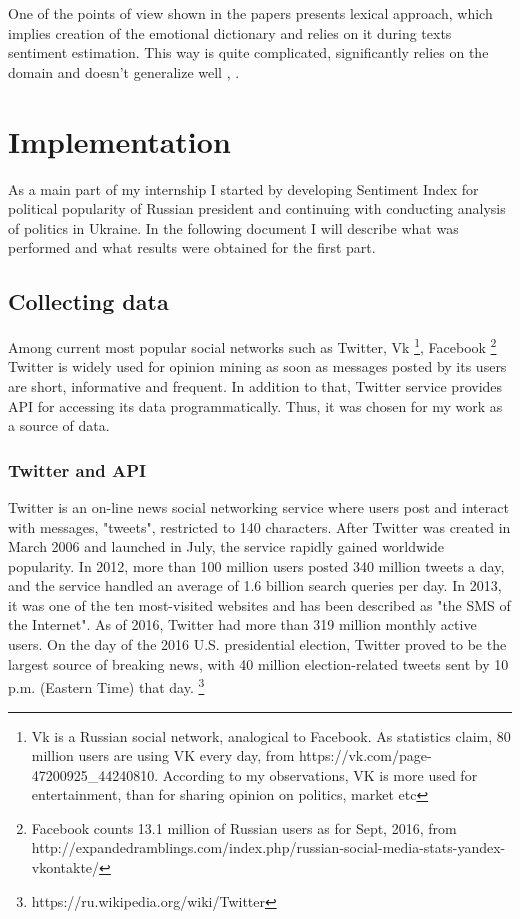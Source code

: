 \documentclass[12pt,a4paper]{article}
\begin{document}
One of the points of view shown in the papers presents lexical approach, which implies creation of the emotional dictionary and relies on it during texts sentiment estimation. This way is quite complicated, significantly relies on the domain and doesn't generalize well \cite{blinov}, \cite{panchenko}.



\newpage

\section{Implementation}
As a main part of my internship I started by developing Sentiment Index for political popularity of Russian president and continuing with conducting analysis of politics in Ukraine. In the following document I will describe what was performed and what results were obtained for the first part.

\subsection{Collecting data}
Among current most popular social networks such as Twitter, Vk \footnote{Vk is a Russian social network, analogical to Facebook. As statistics claim, 80 million users are using VK every day, from https://vk.com/page-47200925\_44240810. According to my observations, VK is more used for entertainment, than for sharing opinion on politics, market etc},  Facebook \footnote{Facebook counts 13.1 million of Russian users as for Sept, 2016, from http://expandedramblings.com/index.php/russian-social-media-stats-yandex-vkontakte/} Twitter is widely used for opinion mining as soon as messages posted by its users are short, informative and frequent. In addition to that, Twitter service provides API for accessing its data programmatically. Thus, it was chosen for my work as a source of data.

\subsubsection{Twitter and API}
Twitter is an on-line news social networking service where users post and interact with messages, "tweets", restricted to 140 characters. After Twitter was created in March 2006 and launched in July, the service rapidly gained worldwide popularity. In 2012, more than 100 million users posted 340 million tweets a day, and the service handled an average of 1.6 billion search queries per day. In 2013, it was one of the ten most-visited websites and has been described as "the SMS of the Internet". As of 2016, Twitter had more than 319 million monthly active users. On the day of the 2016 U.S. presidential election, Twitter proved to be the largest source of breaking news, with 40 million election-related tweets sent by 10 p.m. (Eastern Time) that day. \footnote{https://ru.wikipedia.org/wiki/Twitter}
\end{document}
